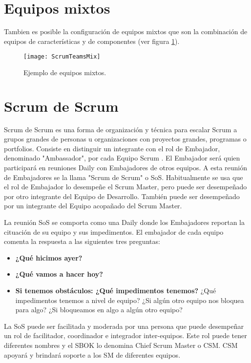 \section{Equipos mixtos}

Tambien es posible la configuración de equipos mixtos que son la combinación de equipos de características y de componentes (ver figura \ref{fig:ScrumTeamsMix}).

\begin{figure}[h]
  \centering
  \texttt{[image: ScrumTeamsMix]}
  \caption{Ejemplo de equipos mixtos.}
  \centering
  \label{fig:ScrumTeamsMix} %
\end{figure}

\section{Scrum de Scrum}

Scrum de Scrum es una forma de organización y técnica para escalar Scrum a grupos grandes de personas u organizaciones con proyectos grandes, programas o portfolios. Consiste en distinguir un integrante con el rol de Embajador, denominado "Ambassador", por cada Equipo Scrum \cite{Stefanini-2013}. El Embajador será quien participará en reuniones Daily con Embajadores de otros equipos. A esta reunión de Embajadores se la llama "Scrum de Scrum" o SoS. Habitualmente se usa que el rol de Embajador lo desempeñe el Scrum Master, pero puede ser desempeñado por otro integrante del Equipo de Desarrollo. También puede ser desempeñado por un integrante del Equipo acopañado del Scrum Master.

La reunión SoS se comporta como una Daily donde los Embajadores reportan la cituación de su equipo y sus impedimentos. El embajador de cada equipo comenta la respuesta a las siguientes tres preguntas:

\begin{itemize}
\item \textbf{¿Qué hicimos ayer?}
\item \textbf{¿Qué vamos a hacer hoy?}
\item \textbf{Si tenemos obstáculos: ¿Qué impedimentos tenemos?} ¿Qué impedimentos tenemos a nivel de equipo? ¿Si algún otro equipo nos bloquea para algo? ¿Si bloqueamos en algo a algún otro equipo?
\end{itemize}

La SoS puede ser facilitada y moderada por una persona que puede desempeñar un rol de facilitador, coordinador e integrador inter-equipos. Este rol puede tener diferentes nombres y el SBOK lo denomina Chief Scrum Master o CSM. CSM apoyará y brindará soporte a los SM de diferentes equipos.

